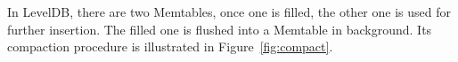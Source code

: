 In LevelDB, there are two Memtables, once one is filled, the other one
is used for further insertion. The filled one is flushed into a
Memtable in background. Its compaction procedure is illustrated in
Figure~\ref{fig:compact}.

